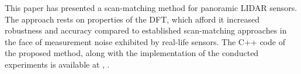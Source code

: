 This paper has presented a scan-matching method for panoramic LIDAR sensors.
The approach rests on properties of the DFT, which afford it increased
robustness and accuracy compared to established scan-matching approaches in the
face of measurement noise exhibited by real-life sensors. The C++ code of the
proposed method, along with the implementation of the conducted experiments is
available at \url{}, .
